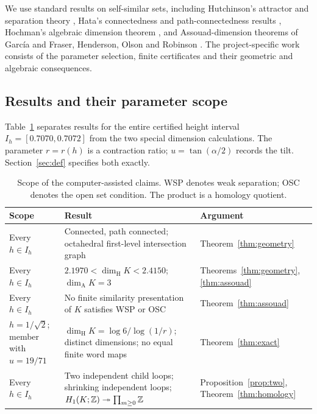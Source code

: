 \documentclass[11pt,a4paper]{article}
\theoremstyle{definition}\newtheorem{definition}[theorem]{Definition}
\theoremstyle{remark}\newtheorem{remark}[theorem]{Remark}
\newcommand{\dimH}{\dim_{\mathrm H}}\newcommand{\dimA}{\dim_{\mathrm A}}
\begin{document}
We use standard results on self-similar sets, including Hutchinson's attractor
and separation theory \cite{hutchinson}, Hata's connectedness and path-connectedness
results \cite{hata}, Hochman's algebraic dimension theorem \cite{hochman}, and
Assouad-dimension theorems of Garc\'ia \cite{garcia} and Fraser, Henderson, Olson
and Robinson \cite{fhor}. The project-specific work consists of the parameter
selection, finite certificates and their geometric and algebraic consequences.

\subsection{Results and their parameter scope}
Table~\ref{tab:scope} separates results for the entire certified height
interval $I_h=[0.7070,0.7072]$ from the two special dimension calculations.
The parameter $r=r(h)$ is a contraction ratio; $u=\tan(\alpha/2)$ records the
tilt. Section~\ref{sec:def} specifies both exactly.

\begin{table}[htbp]
\centering\small
\begin{tabularx}{\linewidth}{@{}>{\raggedright\arraybackslash}p{.21\linewidth}>{\raggedright\arraybackslash}X >{\raggedright\arraybackslash}p{.19\linewidth}@{}}
\toprule Scope & Result & Argument\\\midrule
Every $h\in I_h$ & Connected, path connected; octahedral first-level intersection graph & Theorem~\ref{thm:geometry}\\[4pt]
Every $h\in I_h$ & $2.1970<\dimH K<2.4150$; $\dimA K=3$ & Theorems~\ref{thm:geometry}, \ref{thm:assouad}\\[4pt]
Every $h\in I_h$ & No finite similarity presentation of $K$ satisfies WSP or OSC & Theorem~\ref{thm:assouad}\\[4pt]
$h=1/\sqrt2$; member with $u=19/71$ & $\dimH K=\log6/\log(1/r)$; distinct dimensions; no equal finite word maps & Theorem~\ref{thm:exact}\\[4pt]
Every $h\in I_h$ & Two independent child loops; shrinking independent loops; $H_1(K;\mathbb Z)\twoheadrightarrow\prod_{m\ge0}\mathbb Z$ & Proposition~\ref{prop:two}, Theorem~\ref{thm:homology}\\\bottomrule
\end{tabularx}
\caption{Scope of the computer-assisted claims. WSP denotes weak separation;
OSC denotes the open set condition. The product is a homology quotient.}
\label{tab:scope}
\end{table}
\end{document}
